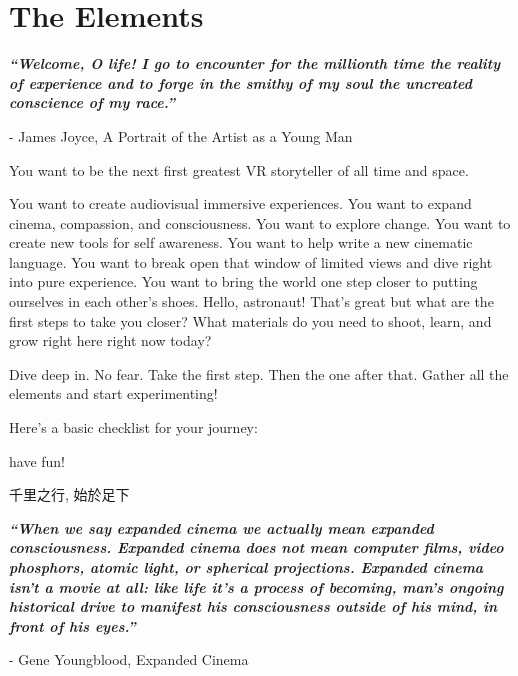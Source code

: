 \chapter{The Elements}
\pagecolor{white}
\label{chap:1}
\begin{fullwidth}

{\itshape\bfseries “Welcome, O life! I go to encounter for the millionth time the reality of experience and to forge in the smithy of my soul the uncreated conscience of my race.”}

- James Joyce, A Portrait of the Artist as a Young Man
\vspace{\baselineskip}

\problem

{\large You want to be the next first greatest VR storyteller of all time and space. \par}

You want to create audiovisual immersive experiences. You want to expand cinema, compassion, and consciousness. You want to explore change. You want to create new tools for self awareness. You want to help write a new cinematic language. You want to break open that window of limited views and dive right into pure experience. You want to bring the world one step closer to putting ourselves in each other’s shoes. Hello, astronaut! That’s great but what are the first steps to take you closer? What materials do you need to shoot, learn, and grow right here right now today?

\solution

{\large Dive deep in. No fear. Take the first step. Then the one after that. Gather all the elements and start experimenting! \par}

Here’s a basic checklist for your journey:
\clearpage
{}




have fun!

\begin{CJK*}{UTF8}{gbsn}
千里之行, 始於足下
\clearpage\end{CJK*}

{\itshape\bfseries “When we say expanded cinema we actually mean expanded consciousness. Expanded cinema does not mean computer films, video phosphors, atomic light, or spherical projections. Expanded cinema isn't a movie at all: like life it's a process of becoming, man's ongoing historical drive to manifest his consciousness outside of his mind, in front of his eyes.”}

- Gene Youngblood, Expanded Cinema
\vspace{\baselineskip}

\clearpage
\end{fullwidth}
